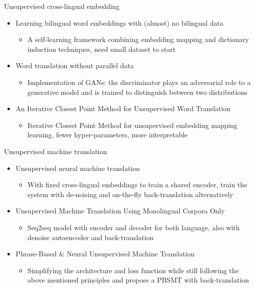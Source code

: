 \documentclass[11pt, a4paper, landscape]{article}
\begin{document}
	\vfill
	Unsupervised cross-lingual embedding
	\begin{itemize}
		\item 	\cite{artetxe2017learning} Learning bilingual word embeddings with (almost) no bilingual data
		\begin{itemize}
			\item A self-learning framework combining embedding mapping and dictionary induction techniques, need small dataset to start
		\end{itemize}	    
		\item 	\cite{conneau2017word} Word translation without parallel data
		\begin{itemize}
			\item Implementation of GANs: the discriminator plays an adversarial role to a generative model and is trained to distinguish between two distributions
		\end{itemize}	    
		\item \cite{hoshen2018iterative} An Iterative Closest Point Method for Unsupervised Word Translation
		\begin{itemize}
			\item Iterative Closest Point Method for unsupervised embedding mapping learning, fewer hyper-parameters, more interpretable
		\end{itemize}	    
	\end{itemize}
	
	
	
	
	
	
	\vfill
	
	\NewPage
	
	\vfill
	Unsupervised machine translation
	\begin{itemize}
		\item 	\cite{artetxe2017unsupervised} Unsupervised neural machine translation
		\begin{itemize}
			\item With fixed cross-lingual embeddings to train a shared encoder, train the system with de-noising and on-the-fly back-translation alternatively
		\end{itemize}
		\item \cite{lample2017unsupervised} Unsupervised Machine Translation Using Monolingual Corpora Only
		\begin{itemize} 
			\item Seq2seq model with encoder and decoder for both language, also with denoise autoencoder and back-translation
		\end{itemize}
		
		\item \cite{artetxe2017unsupervised} Phrase-Based \& Neural Unsupervised Machine Translation
		\begin{itemize}
			\item Simplifying the architecture and loss function while still following the above mentioned principles and propose a PBSMT with back-translation
		\end{itemize}	
		

	\end{itemize}
	
\end{document}
